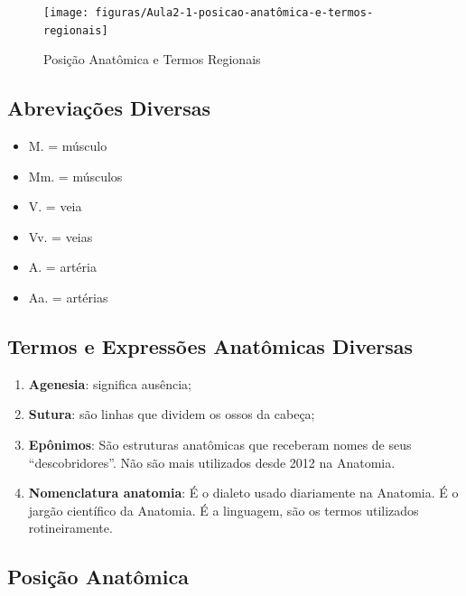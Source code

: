 \documentclass[
]{book}
\providecommand{\tightlist}{%
  \setlength{\itemsep}{0pt}\setlength{\parskip}{0pt}}
\begin{document}
\begin{figure}

{\centering \texttt{[image: figuras/Aula2-1-posicao-anatômica-e-termos-regionais]} 

}

\caption{Posição Anatômica e Termos Regionais}\label{fig:unnamed-chunk-2}
\end{figure}

\hypertarget{abreviauxe7uxf5es-diversas}{%
\subsection{Abreviações Diversas}\label{abreviauxe7uxf5es-diversas}}

\begin{itemize}
\tightlist
\item
  M. = músculo
\item
  Mm. = músculos
\item
  V. = veia
\item
  Vv. = veias
\item
  A. = artéria
\item
  Aa. = artérias
\end{itemize}

\hypertarget{termos-e-expressuxf5es-anatuxf4micas-diversas}{%
\subsection{Termos e Expressões Anatômicas Diversas}\label{termos-e-expressuxf5es-anatuxf4micas-diversas}}

\begin{enumerate}
\def\labelenumi{\arabic{enumi}.}
\tightlist
\item
  \textbf{Agenesia}: significa ausência;
\item
  \textbf{Sutura}: são linhas que dividem os ossos da cabeça;
\item
  \textbf{Epônimos}: São estruturas anatômicas que receberam nomes de seus ``descobridores''. Não são mais utilizados desde 2012 na Anatomia.
\item
  \textbf{Nomenclatura anatomia}: É o dialeto usado diariamente na Anatomia. É o jargão científico da Anatomia. É a linguagem, são os termos utilizados rotineiramente.
\end{enumerate}

\hypertarget{posiuxe7uxe3o-anatuxf4mica}{%
\subsection{Posição Anatômica}\label{posiuxe7uxe3o-anatuxf4mica}}
\end{document}
